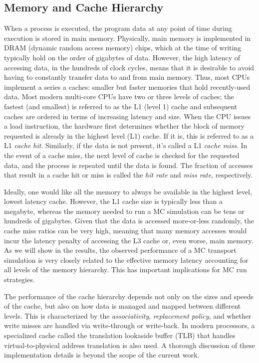 \documentclass{mc2015}
\begin{document}
\subsection{Memory and Cache Hierarchy}

When a process is executed, the program data at any point of time during
execution is stored in main memory. Physically, main memory is implemented in
DRAM (dynamic random access memory) chips, which at the time of writing
typically hold on the order of gigabytes of data. However, the high latency of
accessing data, in the hundreds of clock cycles, means that it is desirable to
avoid having to constantly transfer data to and from main memory. Thus, most
CPUs implement a series a caches: smaller but faster memories that hold
recently-used data. Most modern multi-core CPUs have two or three levels of
caches; the fastest (and smallest) is referred to as the L1 (level 1) cache and
subsequent caches are ordered in terms of increasing latency and size. When the
CPU issues a load instruction, the hardware first determines whether the block
of memory requested is already in the highest level (L1) cache. If it is, this
is referred to as a L1 \emph{cache hit}. Similarly, if the data is not present,
it's called a L1 \emph{cache miss}. In the event of a cache miss, the next
level of cache is checked for the requested data, and the process is repeated
until the data is found. The fraction of accesses that result in a cache hit or
miss is called the \emph{hit rate} and \emph{miss rate}, respectively.

Ideally, one would like all the memory to always be available in the highest
level, lowest latency cache. However, the L1 cache size is typically less than
a megabyte, whereas the memory needed to run a MC simulation can be tens or
hundreds of gigabytes. Given that the data is accessed more-or-less randomly,
the cache miss ratios can be very high, meaning that many memory accesses would
incur the latency penalty of accessing the L3 cache or, even worse, main
memory. As we will show in the results, the observed performance of a MC
transport simulation is very closely related to the effective memory latency
accounting for all levels of the memory hierarchy. This has important
implications for MC run strategies.

The performance of the cache hierarchy depends not only on the sizes and speeds
of the cache, but also on how data is managed and mapped between different
levels. This is characterized by the \emph{associativity}, \emph{replacement
policy}, and whether write misses are handled via write-through or
write-back. In modern processors, a specialized cache called the
translation lookaside buffer (TLB) that handles virtual-to-physical address
translation is also used. A thorough discussion of these implementation details
is beyond the scope of the current work.
\end{document}
